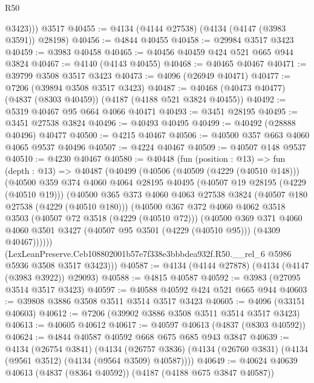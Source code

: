 \begin{lexlean}{R50}
\begin{coremodule}
          @3423)))
    @3517
@40455 := @4134 (@4144 @27538) (@4134 (@4147 (@3983 @3591)) @28198)
@40456 := @4844 @40455
@40458 := @29984 @3517 @3423
@40459 := @3983 @40458
@40465 := @40456 @40459 @424 @521 @665 @944 @3824
@40467 := @4140 (@4143 @40455)
@40468 := @40465 @40467
@40471 := @39799 @3508 @3517 @3423
@40473 := @4096 (@26949 @40471)
@40477 := @7206 (@39894 @3508 @3517 @3423)
@40487 := @40468 (@40473 @40477) (@4837 (@8303 @40459)) (@4187 (@4188 @521 @3824 @40455))
@40492 := @5319 @40467 @95 @664 @4066 @40471
@40493 := @3451 @28195
@40495 := @3451 @27538 @3824
@40496 := @40493 @40495
@40499 := @40492 (@28888 @40496) @40477
@40500 := @4215 @40467
@40506 := @40500 @357 @663 @4060 @4065 @9537 @40496
@40507 := @4224 @40467
@40509 := @40507 @148 @9537
@40510 := @4230 @40467
@40580 := @40448
    (fun (position : @13) =>
    fun (depth : @13) =>
    @40487
      (@40499
        (@40506
          (@40509 (@4229 (@40510 @148)))
          (@40500
            @359
            @374
            @4060
            @4064
            @28195
            @40495
            (@40507 @19 @28195 (@4229 (@40510 @19)))
            (@40500
              @365
              @373
              @4060
              @4063
              @27538
              @3824
              (@40507 @180 @27538 (@4229 (@40510 @180)))
              (@40500
                @367
                @372
                @4060
                @4062
                @3518
                @3503
                (@40507 @72 @3518 (@4229 (@40510 @72)))
                (@40500
                  @369
                  @371
                  @4060
                  @4060
                  @3501
                  @3427
                  (@40507 @95 @3501 (@4229 (@40510 @95)))
                  (@4309 @40467))))))
        (LexLeanPreserve.Ceb108802001b57e7f338e3bbbdea932f.R50.__rel_6
          @5986
          @5936
          @3508
          @3517
          @3423)))
@40587 := @4134 (@4144 @27878) (@4134 (@4147 (@3983 @3922)) @29093)
@40588 := @4815 @40587
@40592 := @3983 (@27095 @3514 @3517 @3423)
@40597 := @40588 @40592 @424 @521 @665 @944
@40603 := @39808 @3886 @3508 @3511 @3514 @3517 @3423
@40605 := @4096 (@33151 @40603)
@40612 := @7206 (@39902 @3886 @3508 @3511 @3514 @3517 @3423)
@40613 := @40605 @40612
@40617 := @40597 @40613 (@4837 (@8303 @40592))
@40624 := @4844 @40587 @40592 @668 @675 @685 @943 @3847
@40639 := @4134
    (@26754 @3841)
    (@4134 (@26757 @3836) (@4134 (@26760 @3831) (@4134 (@9561 @3512) (@4134 (@9564 @3509) @40587))))
@40649 := @40624 @40639 @40613 (@4837 (@8364 @40592)) (@4187 (@4188 @675 @3847 @40587))

\end{coremodule}
\end{lexlean}
